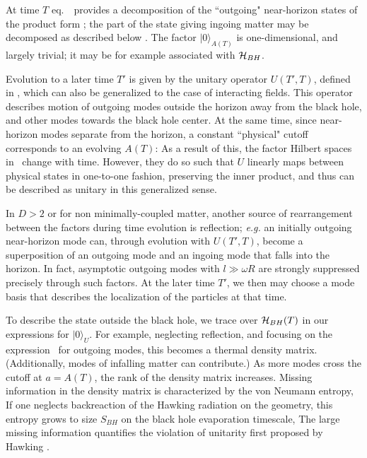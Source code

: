 At time $T$ eq.~\sqopversc\ provides a decomposition of the ``outgoing" near-horizon states of the product form \hprod; the part of the state giving ingoing matter may be decomposed as described below \kruskbasis.  The factor $|0\rangle_{A(T)}$ is one-dimensional, and largely trivial; it may be for example associated with ${\cal H}_{BH}$.

Evolution to a later time $T'$ is given by the unitary operator $U(T',T)$, defined in \unitop, which can also be generalized to the case of interacting fields.  This operator describes motion of outgoing modes outside the horizon away from the black hole, and other modes towards the black hole center.  At the same time, since near-horizon modes separate from the horizon, a constant ``physical" cutoff corresponds to an evolving $A(T)$:
%
\eqn{}
%
As a result of this, the factor Hilbert spaces in \hprod\ change with time.  However, they do so such that $U$ linearly maps between physical states in one-to-one fashion, preserving the inner product, and thus can be described as unitary in this generalized sense.

In $D>2$ or for non minimally-coupled matter, another source of rearrangement between the factors during time evolution is reflection; {\it e.g.} an initially outgoing near-horizon mode can, through evolution with $U(T',T)$, become a superposition of an outgoing mode and an ingoing mode that falls into the horizon.  In fact, asymptotic outgoing modes with $l\gg \omega R$ are strongly suppressed precisely through such factors.  At the later time $T'$, we then may choose a mode basis that describes the localization of the particles at that time.  


To describe the state outside the black hole, we trace over ${\cal H}_{BH}(T)$ in our expressions for $|0\rangle_U$.  For example, neglecting reflection, and focusing on the expression \statepack\ for outgoing modes, this becomes
%
\eqn{}
%
a thermal density matrix.  (Additionally, modes of infalling matter can contribute.)  As more modes cross the cutoff at $a=A(T)$, the rank of the density matrix increases. Missing information in the density matrix is characterized by the von Neumann entropy,
%
\eqn{}
%
If one neglects backreaction of the Hawking radiation on the geometry, this entropy grows to size $S_{BH}$ on the black hole evaporation timescale, 
%
\eqn{}
%
The large missing information quantifies the violation of unitarity first proposed by Hawking .






